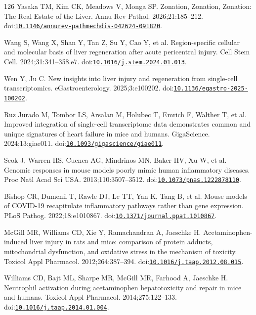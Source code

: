 \begin{thebibliography}{126}
Yasaka TM, Kim CK, Meadows V, Monga SP. Zonation, Zonation, Zonation: The Real Estate of the Liver. Annu Rev Pathol. 2026;21:185--212. doi:\href{https://doi.org/10.1146/annurev-pathmechdis-042624-091820}{\nolinkurl{10.1146/annurev-pathmechdis-042624-091820}}.

Wang S, Wang X, Shan Y, Tan Z, Su Y, Cao Y, et al. Region-specific cellular and molecular basis of liver regeneration after acute pericentral injury. Cell Stem Cell. 2024;31:341--358.e7. doi:\href{https://doi.org/10.1016/j.stem.2024.01.013}{\nolinkurl{10.1016/j.stem.2024.01.013}}.

Wen Y, Ju C. New insights into liver injury and regeneration from single-cell transcriptomics. eGastroenterology. 2025;3:e100202. doi:\href{https://doi.org/10.1136/egastro-2025-100202}{\nolinkurl{10.1136/egastro-2025-100202}}.

Ruz Jurado M, Tombor LS, Arsalan M, Holubec T, Emrich F, Walther T, et al. Improved integration of single-cell transcriptome data demonstrates common and unique signatures of heart failure in mice and humans. GigaScience. 2024;13:giae011. doi:\href{https://doi.org/10.1093/gigascience/giae011}{\nolinkurl{10.1093/gigascience/giae011}}.

Seok J, Warren HS, Cuenca AG, Mindrinos MN, Baker HV, Xu W, et al. Genomic responses in mouse models poorly mimic human inflammatory diseases. Proc Natl Acad Sci USA. 2013;110:3507--3512. doi:\href{https://doi.org/10.1073/pnas.1222878110}{\nolinkurl{10.1073/pnas.1222878110}}.

Bishop CR, Dumenil T, Rawle DJ, Le TT, Yan K, Tang B, et al. Mouse models of COVID-19 recapitulate inflammatory pathways rather than gene expression. PLoS Pathog. 2022;18:e1010867. doi:\href{https://doi.org/10.1371/journal.ppat.1010867}{\nolinkurl{10.1371/journal.ppat.1010867}}.

McGill MR, Williams CD, Xie Y, Ramachandran A, Jaeschke H. Acetaminophen-induced liver injury in rats and mice: comparison of protein adducts, mitochondrial dysfunction, and oxidative stress in the mechanism of toxicity. Toxicol Appl Pharmacol. 2012;264:387--394. doi:\href{https://doi.org/10.1016/j.taap.2012.08.015}{\nolinkurl{10.1016/j.taap.2012.08.015}}.

Williams CD, Bajt ML, Sharpe MR, McGill MR, Farhood A, Jaeschke H. Neutrophil activation during acetaminophen hepatotoxicity and repair in mice and humans. Toxicol Appl Pharmacol. 2014;275:122--133. doi:\href{https://doi.org/10.1016/j.taap.2014.01.004}{\nolinkurl{10.1016/j.taap.2014.01.004}}.


\end{thebibliography}
